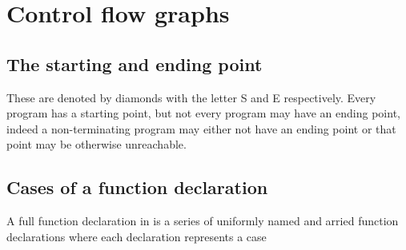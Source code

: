 \section{Control flow graphs}\label{appendix:cfg}

\subsection{The starting and ending point}

These are denoted by diamonds with the letter S and E respectively. Every
program has a starting point, but not every program may have an ending point,
indeed a non-terminating program may either not have an ending point or that
point may be otherwise unreachable.

\subsection{Cases of a function declaration}

A full function declaration in \D{} is a series of uniformly named and arried function declarations where each declaration represents a case 
